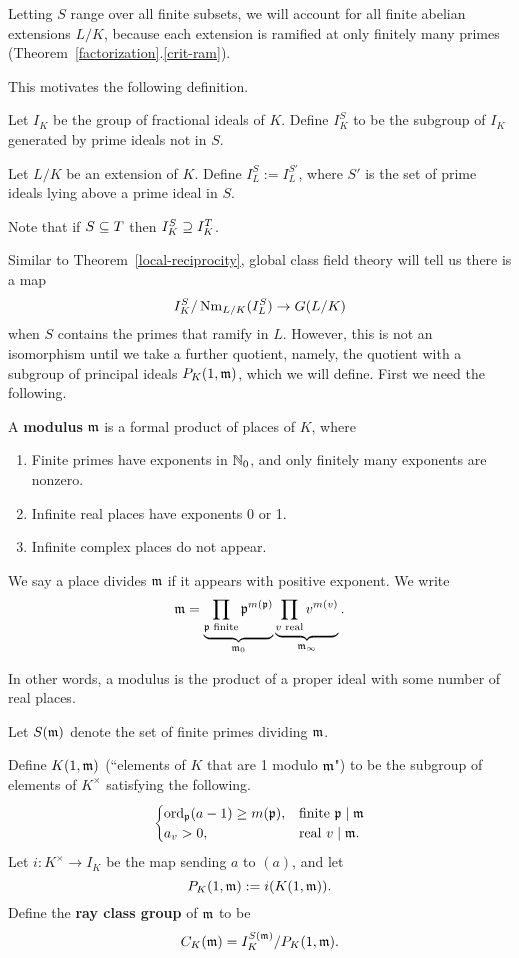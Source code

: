 Letting $S$ range over all finite subsets, we will account for all finite abelian extensions $L/K$, because each extension is ramified at only finitely many primes (Theorem~\ref{factorization}.\ref{crit-ram}).

This motivates the following definition.
\begin{df}
Let $I_K$ be the group of fractional ideals of $K$. Define $I_K^S$ to be the subgroup of $I_K$ generated by prime ideals not in $S$.

Let $L/K$ be an extension of $K$. Define $I_L^S:=I_L^{S'}$, where $S'$ is the set of prime ideals lying above a prime ideal in $S$.
\end{df}
Note that if $S\subseteq T$ then $I_K^S\supseteq I_K^T$.

Similar to Theorem~\ref{local-reciprocity}, global class field theory will tell us there is a map \[I_K^S/\operatorname{Nm}_{L/K}(I^S_L)\to G(L/K)\] when $S$ contains the primes that ramify in $L$. However, this is not an isomorphism until we take a further quotient, namely, the quotient with a subgroup of principal ideals $P_K(1,\mathfrak{m})$, which we will define. First we need the following.
\begin{df}
A \textbf{modulus} $\mathfrak{m}$ is a formal product of places of $K$, where
\begin{enumerate}
\item
Finite primes have exponents in $\mathbb{N}_0$, and only finitely many exponents are nonzero.
\item
Infinite real places have exponents 0 or 1.
\item
Infinite complex places do not appear.
\end{enumerate}
We say a place divides $\mathfrak{m}$ if it appears with positive exponent. We write
\[
\mathfrak{m}=\underbrace{\prod_{\mathfrak{p} \text{ finite}} \mathfrak{p}^{m(\mathfrak{p})}}_{\mathfrak{m}_0}
\underbrace{
\prod_{v\text{ real}} v^{m(v)}
}_{\mathfrak{m}_{\infty}}.
\]
\end{df}
In other words, a modulus is the product of a proper ideal with some number of real places.
\begin{df}
Let $S(\mathfrak{m})$ denote the set of finite primes dividing $\mathfrak{m}$.

Define $K(1,{\mathfrak{m}})$ (``elements of $K$ that are 1 modulo $\mathfrak{m}$") to be the subgroup of elements of $K^{\times}$ satisfying the following.%
\[
\begin{cases}
\operatorname{ord}_{\mathfrak{p}}(a-1)\ge m(\mathfrak{p}),&\text{finite }\mathfrak{p}\mid \mathfrak{m}\\
a_v>0,&\text{real }v\mid \mathfrak{m}.
\end{cases}
\]
Let $i:K^{\times}\to I_K$ be the map sending $a$ to $(a)$, and let 
\[
P_K(1,{\mathfrak{m}}):=i(K(1,{\mathfrak{m}})).
\]
Define the \textbf{ray class group} of $\mathfrak{m}$ to be
\[
C_K(\mathfrak{m})=I_K^{S(\mathfrak{m})}/P_K(1,{\mathfrak{m}}).
\]
\end{df}
